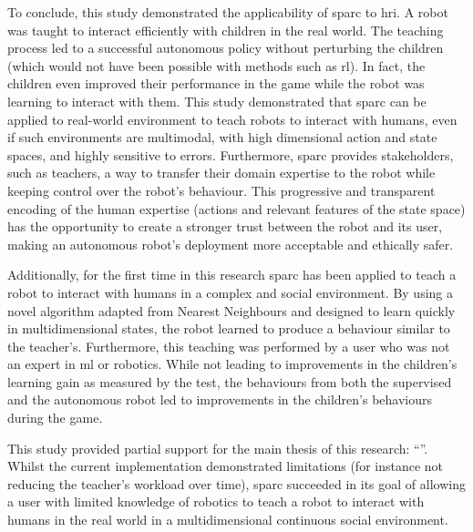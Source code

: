 To conclude, this study demonstrated the applicability of \gls{sparc} to \gls{hri}. A robot was taught to interact efficiently with children in the real world. The teaching process led to a successful autonomous policy without perturbing the children (which would not have been possible with methods such as \gls{rl}). In fact, the children even improved their performance in the game while the robot was learning to interact with them. This study demonstrated that \gls{sparc} can be applied to real-world environment to teach robots to interact with humans, even if such environments are multimodal, with high dimensional action and state spaces, and highly sensitive to errors. Furthermore, \gls{sparc} provides stakeholders, such as teachers, a way to transfer their domain expertise to the robot while keeping control over the robot's behaviour. This progressive and transparent encoding of the human expertise (actions and relevant features of the state space) has the opportunity to create a stronger trust between the robot and its user, making an autonomous robot's deployment more acceptable and ethically safer.

Additionally, for the first time in this research \gls{sparc} has been applied to teach a robot to interact with humans in a complex and social environment. By using a novel algorithm adapted from Nearest Neighbours and designed to learn quickly in multidimensional states, the robot learned to produce a behaviour similar to the teacher's. Furthermore, this teaching was performed by a user who was not an expert in \gls{ml} or robotics. While not leading to improvements in the children's learning gain as measured by the test, the behaviours from both the supervised and the autonomous robot led to improvements in the children's behaviours during the game. 

This study provided partial support for the main thesis of this research: ``\thesis''. Whilst the current implementation demonstrated limitations (for instance not reducing the teacher's workload over time), \gls{sparc} succeeded in its goal of allowing a user with limited knowledge of robotics to teach a robot to interact with humans in the real world in a multidimensional continuous social environment.